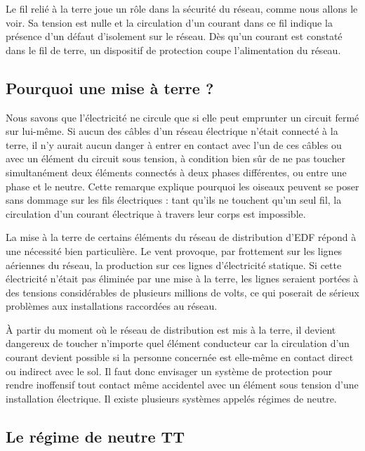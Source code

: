 Le fil relié à la terre joue un rôle dans la sécurité du réseau, comme nous allons le voir. Sa tension est nulle et la circulation d’un courant dans ce fil indique la présence d’un défaut d’isolement sur le réseau. Dès qu’un courant est constaté dans le fil de terre, un dispositif de protection coupe l’alimentation du réseau.


\subsection{Pourquoi une mise à terre ?}

Nous savons que l’électricité ne circule que si elle peut emprunter un circuit fermé sur lui-même. Si aucun des câbles d’un réseau électrique n’était connecté à la terre, il n’y aurait aucun danger à entrer en contact avec l’un de ces câbles ou avec un élément du circuit sous tension, à condition bien sûr de ne pas toucher simultanément deux éléments connectés à deux phases différentes, ou entre une phase et le neutre. Cette remarque explique pourquoi les oiseaux peuvent se poser sans dommage sur les fils électriques : tant qu’ils ne touchent qu’un seul fil, la circulation d’un courant électrique à travers leur corps est impossible.
\vspace{0.3cm}

La mise à la terre de certains éléments du réseau de distribution d’EDF répond à une nécessité bien particulière. Le vent provoque, par frottement sur les lignes aériennes du réseau, la production sur ces lignes d’électricité statique. Si cette électricité n’était pas éliminée par une mise à la terre, les lignes seraient portées à des tensions considérables de plusieurs millions de volts, ce qui poserait de sérieux problèmes aux installations raccordées au réseau.
\vspace{0.3cm}

À partir du moment où le réseau de distribution est mis à la terre, il devient dangereux de toucher n’importe quel élément conducteur car la circulation d’un courant devient possible si la personne concernée est elle-même en contact direct ou indirect avec le sol. Il faut donc envisager un système de protection pour rendre inoffensif tout contact même accidentel avec un élément sous tension d’une installation électrique. Il existe plusieurs systèmes appelés régimes de neutre.


\subsection{Le régime de neutre TT}

